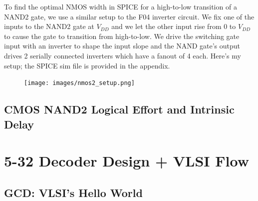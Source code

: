 \documentclass[11pt]{article}
\begin{document}
To find the optimal NMOS width in SPICE for a high-to-low transition of a NAND2 gate, we use a similar setup to the F04 inverter circuit. We fix one of the inputs to the NAND2 gate at $V_{DD}$ and we let the other input rise from 0 to $V_{DD}$ to cause the gate to transition from high-to-low. We drive the switching gate input with an inverter to shape the input slope and the NAND gate's output drives 2 serially connected inverters which have a fanout of 4 each. Here's my setup; the SPICE sim file is provided in the appendix.

\begin{figure}[H]
	\centerline{\texttt{[image: images/nmos2\_setup.png]}}
\end{figure}
 
\subsection{CMOS NAND2 Logical Effort and Intrinsic Delay}


\section{5-32 Decoder Design + VLSI Flow}

\subsection{GCD: VLSI's Hello World}
\end{document}
